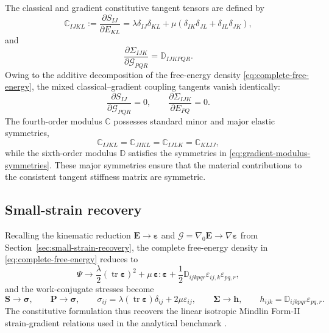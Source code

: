 \documentclass[preprint,12pt]{elsarticle}
\DeclareMathOperator{\tr}{tr}
\begin{document}
The classical and gradient constitutive tangent tensors are defined by
\begin{equation}
 \mathbb{C}_{IJKL}
 :=\frac{\partial S_{IJ}}{\partial E_{KL}}
 =\lambda\delta_{IJ}\delta_{KL}
 +\mu\left(\delta_{IK}\delta_{JL}
 +\delta_{IL}\delta_{JK}\right),
 \label{eq:classical-tangent}
\end{equation}
and
\begin{equation}
 \frac{\partial\Sigma_{IJK}}{\partial\mathcal{G}_{PQR}}
 =\mathbb{D}_{IJKPQR}.
 \label{eq:gradient-tangent}
\end{equation}
Owing to the additive decomposition of the free-energy density
\eqref{eq:complete-free-energy}, the mixed classical--gradient coupling
tangents vanish identically:
\begin{equation}
 \frac{\partial S_{IJ}}{\partial\mathcal{G}_{PQR}}=0,
 \qquad
 \frac{\partial\Sigma_{IJK}}{\partial E_{PQ}}=0.
 \label{eq:zero-mixed-tangents}
\end{equation}
The fourth-order modulus $\mathbb{C}$ possesses standard minor and major
elastic symmetries,
\begin{equation}
 \mathbb{C}_{IJKL}
 =\mathbb{C}_{JIKL}
 =\mathbb{C}_{IJLK}
 =\mathbb{C}_{KLIJ},
 \label{eq:classical-tangent-symmetries}
\end{equation}
while the sixth-order modulus $\mathbb{D}$ satisfies the symmetries in
\eqref{eq:gradient-modulus-symmetries}. These major symmetries ensure that the
material contributions to the consistent tangent stiffness matrix are
symmetric.

\subsection{Small-strain recovery}
\label{sec:constitutive-small-strain-recovery}

Recalling the kinematic reduction $\mathbf{E}\longrightarrow\boldsymbol{\varepsilon}$ and $\bm{\mathcal{G}}=\nabla_0\mathbf{E}\longrightarrow\nabla\boldsymbol{\varepsilon}$ from Section~\ref{sec:small-strain-recovery}, the complete free-energy density in \eqref{eq:complete-free-energy} reduces to
\begin{equation}
 \Psi\longrightarrow
 \frac{\lambda}{2}\left(\tr\boldsymbol{\varepsilon}\right)^2
 +\mu\,\boldsymbol{\varepsilon}:\boldsymbol{\varepsilon}
 +\frac{1}{2}\mathbb{D}_{ijkpqr}
 \varepsilon_{ij,k}\varepsilon_{pq,r},
 \label{eq:small-strain-free-energy}
\end{equation}
and the work-conjugate stresses become
\begin{equation}
 \mathbf{S}\longrightarrow\boldsymbol{\sigma},
 \qquad
 \mathbf{P}\longrightarrow\boldsymbol{\sigma},
 \qquad
 \sigma_{ij}=\lambda\left(\tr\boldsymbol{\varepsilon}\right)\delta_{ij}
 +2\mu\varepsilon_{ij},
 \qquad
 \boldsymbol{\Sigma}\longrightarrow\mathbf{h},
 \qquad
 h_{ijk}=\mathbb{D}_{ijkpqr}\varepsilon_{pq,r}.
 \label{eq:small-strain-constitutive-recovery}
\end{equation}
The constitutive formulation thus recovers the linear isotropic Mindlin
Form-II strain-gradient relations used in the analytical benchmark
\cite{Mindlin1964,MindlinEshel1968}.
\end{document}
